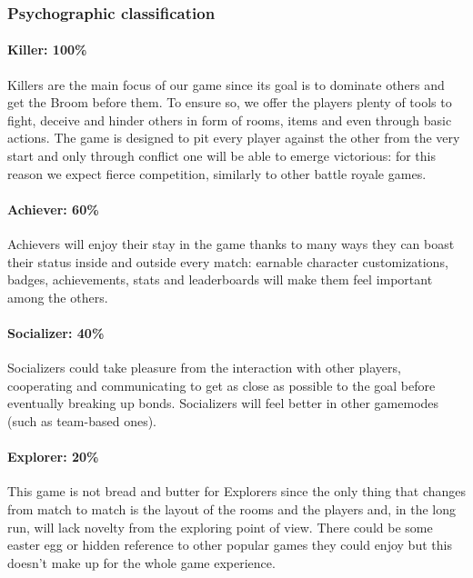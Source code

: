\subsubsection{Psychographic classification}


\paragraph{Killer: 100\%}
Killers are the main focus of our game since its goal is to dominate others and get the Broom before them. To ensure so, we offer the players plenty of tools to fight, deceive and hinder others in form of rooms, items and even through basic actions. The game is designed to pit every player against the other from the very start and only through conflict one will be able to emerge victorious: for this reason we expect fierce competition, similarly to other battle royale games.

\paragraph{Achiever: 60\%}
Achievers will enjoy their stay in the game thanks to many ways they can boast their status inside and outside every match: earnable character customizations, badges, achievements, stats and leaderboards will make them feel important among the others.

\paragraph{Socializer: 40\%}
Socializers could take pleasure from the interaction with other players, cooperating and communicating to get as close as possible to the goal before eventually breaking up bonds. Socializers will feel better in other gamemodes (such as team-based ones).

\paragraph{Explorer: 20\%}
This game is not bread and butter for Explorers since the only thing that changes from match to match is the layout of the rooms and the players and, in the long run, will lack novelty from the exploring point of view. There could be some easter egg or hidden reference to other popular games they could enjoy but this doesn't make up for the whole game experience.
